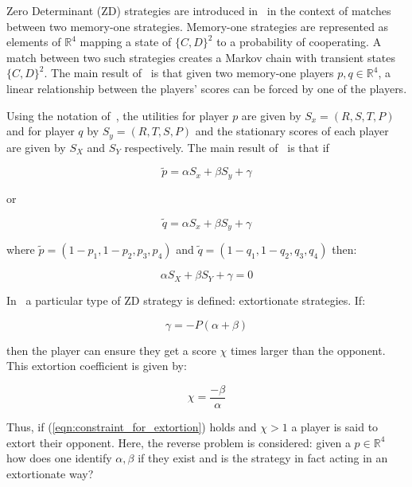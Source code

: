 \documentclass[a4paper]{article}
\begin{document}
Zero Determinant (ZD) strategies are introduced in~\cite{Press2012} in the
context of matches between two memory-one strategies.  Memory-one strategies are
represented as elements of \(\mathbb{R}^4\) mapping a state of \({\{C, D\}}^2\)
to a probability of cooperating.  A match between two such strategies creates a
Markov chain with transient states \({\{C, D\}}^2\).  The main result
of~\cite{Press2012} is that given two memory-one players \(p,
q\in\mathbb{R}^4\), a linear relationship between the players' scores can be
forced by one of the players.

Using the notation of~\cite{Press2012}, the utilities for player \(p\)
are given by \(S_x=(R, S, T, P)\) and for player \(q\) by \(S_y=(R, T, S, P)\)
and the stationary scores of each player are given by \(S_X\) and \(S_Y\)
respectively. The main result of~\cite{Press2012} is that if

\begin{equation}\label{eqn:linear_relationship_for_p}
    \tilde p=\alpha S_x + \beta S_y + \gamma
\end{equation}

or

\begin{equation}\label{eqn:linear_relationship_for_q}
    \tilde q=\alpha S_x + \beta S_y + \gamma
\end{equation}

where \(\tilde p = (1 - p_1, 1 - p_2, p_3, p_4)\) and
\(\tilde q = (1 - q_1, 1 - q_2, q_3, q_4)\) then:

\begin{equation}
    \alpha S_X + \beta S_Y + \gamma = 0
\end{equation}

In~\cite{Press2012} a particular type of ZD strategy is defined: extortionate
strategies. If:

\begin{equation}\label{eqn:constraint_for_extortion}
    \gamma = - P(\alpha + \beta)
\end{equation}

then the player can ensure they get a score \(\chi\) times
larger than the opponent. This extortion coefficient is given by:

\begin{equation}\label{eqn:definition_of_chi}
    \chi=\frac{-\beta}{\alpha}
\end{equation}

Thus, if (\ref{eqn:constraint_for_extortion}) holds and \(\chi >1\) a player is
said to extort their opponent.
Here, the reverse problem is considered: given a
\(p\in\mathbb{R}^4\) how does one identify \(\alpha, \beta\) if they
exist and is the strategy in fact acting in an extortionate way?
\end{document}
